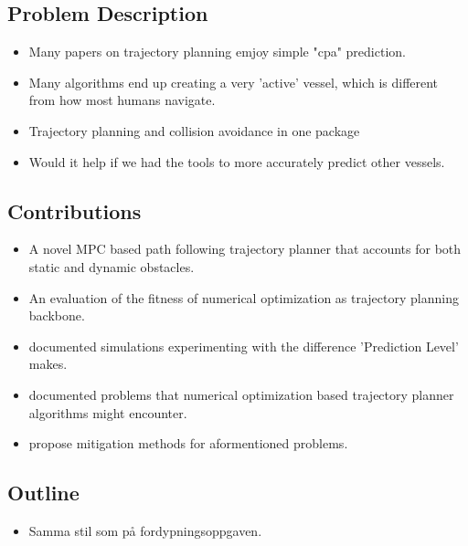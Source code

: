\subsection{Problem Description}
\begin{itemize}
    \item Many papers on trajectory planning emjoy simple "cpa" prediction.
    \item Many algorithms end up creating a very 'active' vessel, which is different from how most humans navigate.
    \item Trajectory planning and collision avoidance in one package
    \item Would it help if we had the tools to more accurately predict other vessels.
\end{itemize}

\subsection{Contributions}
\begin{itemize}
    \item A novel MPC based path following trajectory planner that accounts for both static and dynamic obstacles.
    \item An evaluation of the fitness of numerical optimization as trajectory planning backbone.
    \item documented simulations experimenting with the difference 'Prediction Level' makes.
    \item documented problems that numerical optimization based trajectory planner algorithms might encounter.
    \item propose mitigation methods for aformentioned problems.
\end{itemize}

\subsection{Outline}
\begin{itemize}
    \item Samma stil som på fordypningsoppgaven.
\end{itemize}


\newpage